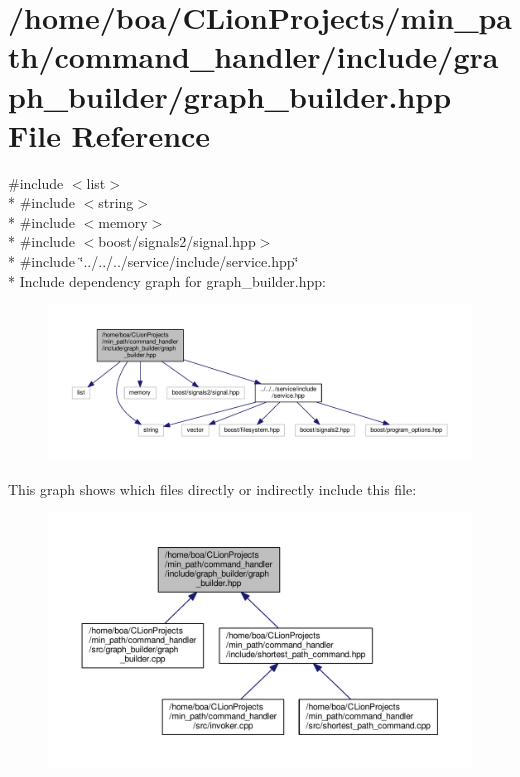 \hypertarget{a00020}{}\section{/home/boa/\+C\+Lion\+Projects/min\+\_\+path/command\+\_\+handler/include/graph\+\_\+builder/graph\+\_\+builder.hpp File Reference}
\label{a00020}
{\ttfamily \#include $<$list$>$}\\*
{\ttfamily \#include $<$string$>$}\\*
{\ttfamily \#include $<$memory$>$}\\*
{\ttfamily \#include $<$boost/signals2/signal.\+hpp$>$}\\*
{\ttfamily \#include \char`\"{}../../../service/include/service.\+hpp\char`\"{}}\\*
Include dependency graph for graph\+\_\+builder.\+hpp\+:
\nopagebreak
\begin{figure}[H]
\begin{center}
\leavevmode
\includegraphics[width=350pt]{d4/dca/a00048}
\end{center}
\end{figure}
This graph shows which files directly or indirectly include this file\+:
\nopagebreak
\begin{figure}[H]
\begin{center}
\leavevmode
\includegraphics[width=350pt]{d2/dee/a00049}
\end{center}
\end{figure}
